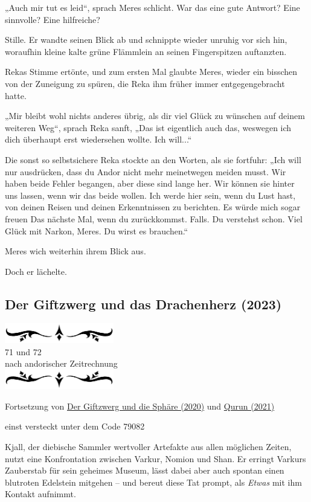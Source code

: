 \documentclass[10pt, a4paper, oneside]{book}
\newcommand{\hypref}[1]{%
    \hyperref[#1]{#1}%
}
\newcommand{\az}[1]{%
    \begin{center}
        \includegraphics[width=180px]{Das Erbe des Wunderkindes/verzierung1.png}\\
        {\Huge #1} \\
        {nach andorischer Zeitrechnung}\\
        \includegraphics[width=180px]{Das Erbe des Wunderkindes/verzierung2.png}
    \end{center}
    \extramarks{}{#1 a.Z.}
}
\begin{document}
„Auch mir tut es leid“, sprach Meres schlicht. War das eine gute Antwort? Eine sinnvolle? Eine hilfreiche?

Stille. Er wandte seinen Blick ab und schnippte wieder unruhig vor sich hin, woraufhin kleine kalte grüne Flämmlein an seinen Fingerspitzen auftanzten.

Rekas Stimme ertönte, und zum ersten Mal glaubte Meres, wieder ein bisschen von der Zuneigung zu spüren, die Reka ihm früher immer entgegengebracht hatte.

„Mir bleibt wohl nichts anderes übrig, als dir viel Glück zu wünschen auf deinem weiteren Weg“, sprach Reka sanft, „Das ist eigentlich auch das, weswegen ich dich überhaupt erst wiedersehen wollte. Ich will...“

Die sonst so selbstsichere Reka stockte an den Worten, als sie fortfuhr: „Ich will nur ausdrücken, dass du Andor nicht mehr meinetwegen meiden musst. Wir haben beide Fehler begangen, aber diese sind lange her. Wir können sie hinter uns lassen, wenn wir das beide wollen. Ich werde hier sein, wenn du Lust hast, von deinen Reisen und deinen Erkenntnissen zu berichten. Es würde mich sogar freuen Das nächste Mal, wenn du zurückkommst. Falls. Du verstehst schon. Viel Glück mit Narkon, Meres. Du wirst es brauchen.“

Meres wich weiterhin ihrem Blick aus.

Doch er lächelte.








\begin{chapterbox}
    \chapter{Der Giftzwerg und das Drachenherz (2023)}
    \label{Der Giftzwerg und das Drachenherz (2023)}
    \az{71 und 72}

    \begin{center}
        Fortsetzung von \hypref{Der Giftzwerg und die Sphäre (2020)} und \hypref{Qurun (2021)}
        
        einst versteckt unter dem Code 79082
    \end{center}
    
    Kjall, der diebische Sammler wertvoller Artefakte aus allen möglichen Zeiten, nutzt eine Konfrontation zwischen Varkur, Nomion und Shan. Er erringt Varkurs Zauberstab für sein geheimes Museum, lässt dabei aber auch spontan einen blutroten Edelstein mitgehen – und bereut diese Tat prompt, als \textit{Etwas} mit ihm Kontakt aufnimmt.
\end{chapterbox}
\end{document}
